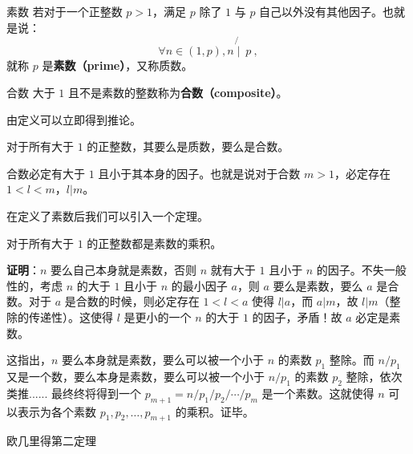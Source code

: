 
\begin{definition}{素数}
若对于一个正整数 $p > 1$，满足 $p$ 除了 $1$ 与 $p$ 自己以外没有其他因子。也就是说：
\begin{equation}
\forall n \in (1,p), n \not{\mid} ~ p ~,
\end{equation}
就称 $p$ 是\textbf{素数（prime）}，又称质数。
\end{definition}

\begin{definition}{合数}
大于 $1$ 且不是素数的整数称为\textbf{合数（composite）}。
\end{definition}

由定义可以立即得到推论。
\begin{corollary}{}
对于所有大于 $1$ 的正整数，其要么是质数，要么是合数。
\end{corollary}
\begin{corollary}{}
合数必定有大于 $1$ 且小于其本身的因子。也就是说对于合数 $m > 1$，必定存在 $1 < l < m$，$l | m$。
\end{corollary}



在定义了素数后我们可以引入一个定理。
\begin{theorem}{}\label{the_prmnt_1}
对于所有大于 $1$ 的正整数都是素数的乘积。
\end{theorem}
\textbf{证明}：$n$ 要么自己本身就是素数，否则 $n$ 就有大于 $1$ 且小于 $n$ 的因子。不失一般性的，考虑 $n$ 的大于 $1$ 且小于 $n$ 的最小因子 $a$，则 $a$ 要么是素数，要么 $a$ 是合数。对于 $a$ 是合数的时候，则必定存在 $1 < l < a$ 使得 $l | a$，而 $a | m$，故 $l|m$（整除的传递性）。这使得 $l$ 是更小的一个 $n$ 的大于 $1$ 的因子，矛盾！故 $a$ 必定是素数。

这指出，$n$ 要么本身就是素数，要么可以被一个小于 $n$ 的素数 $p_1$ 整除。而 $n / p_1$ 又是一个数，要么本身是素数，要么可以被一个小于 $n / p_1$ 的素数 $p_2$ 整除，依次类推...... 最终终将得到一个 $p_{m+1} = n/ p_1 / p_2 / \cdots / p_m$ 是一个素数。这就使得 $n$ 可以表示为各个素数 $p_1, p_2, \dots, p_{m+1}$ 的乘积。证毕。

\begin{theorem}{欧几里得第二定理}

\end{theorem}